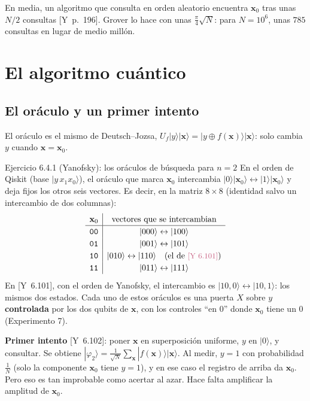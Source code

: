 \documentclass[11pt, a4paper, twoside, openright]{report}
\providecommand{\ket}[1]{|#1\rangle}
\newcommand{\bx}{\mathbf{x}}
\newcommand{\Yan}[1]{\textcolor{rosaviejo}{\small[Y~#1]}}  %
\begin{document}
\noindent En media, un algoritmo que consulta en orden aleatorio encuentra $\bx_0$ tras unas $N/2$ consultas \Yan{p.~196}. Grover lo hace con unas $\frac{\pi}{4}\sqrt N$: para $N = 10^6$, unas $785$ consultas en lugar de medio millón.

\cleardoublepage
\section{El algoritmo cuántico}

\subsection{El oráculo y un primer intento}

\noindent El oráculo es el mismo de Deutsch--Jozsa, $U_f\ket{y}\ket{\bx} = \ket{y\oplus f(\bx)}\ket{\bx}$: solo cambia $y$ cuando $\bx = \bx_0$.

\begin{ejercicio}{Ejercicio 6.4.1 (Yanofsky): los oráculos de búsqueda para $n = 2$}
En el orden de Qiskit (base $\ket{y\,x_1x_0}$), el oráculo que marca $\bx_0$ intercambia $\ket{0}\ket{\bx_0}\leftrightarrow\ket{1}\ket{\bx_0}$ y deja fijos los otros seis vectores. Es decir, en la matriz $8\times8$ (identidad salvo un intercambio de dos columnas):
\[
\renewcommand{\arraystretch}{1.2}
\begin{array}{c|c}
\bx_0 & \text{vectores que se intercambian} \\ \hline
\texttt{00} & \ket{000}\leftrightarrow\ket{100} \\
\texttt{01} & \ket{001}\leftrightarrow\ket{101} \\
\texttt{10} & \ket{010}\leftrightarrow\ket{110} \quad\text{(el de \Yan{6.101})} \\
\texttt{11} & \ket{011}\leftrightarrow\ket{111}
\end{array}
\]
En \Yan{6.101}, con el orden de Yanofsky, el intercambio es $\ket{10,0}\leftrightarrow\ket{10,1}$: los mismos dos estados. Cada uno de estos oráculos es una puerta $X$ sobre $y$ \textbf{controlada} por los dos qubits de $\bx$, con los controles ``en $0$'' donde $\bx_0$ tiene un $0$ (Experimento 7).
\end{ejercicio}

\noindent \textbf{Primer intento} \Yan{6.102}: poner $\bx$ en superposición uniforme, $y$ en $\ket{0}$, y consultar. Se obtiene $\ket{\varphi_2} = \frac{1}{\sqrt N}\sum_{\bx}\ket{f(\bx)}\ket{\bx}$. Al medir, $y = 1$ con probabilidad $\frac1N$ (solo la componente $\bx_0$ tiene $y = 1$), y en ese caso el registro de arriba da $\bx_0$. Pero eso es tan improbable como acertar al azar. Hace falta amplificar la amplitud de $\bx_0$.
\end{document}
